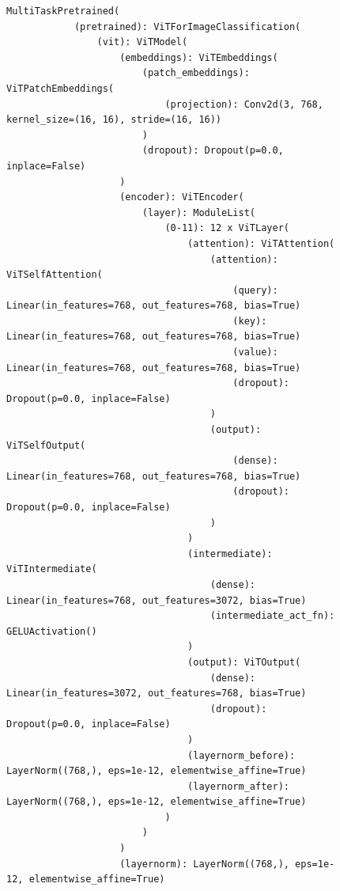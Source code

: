 \documentclass{article}
\begin{document}
\begin{figure}[H]
    \centering
    \begin{minipage}[b]{\textwidth}
        \begin{lstlisting}[caption={model architecture}, label={lst:appendix_code}, basicstyle=\small\small\ttfamily]
        MultiTaskPretrained(
            (pretrained): ViTForImageClassification(
                (vit): ViTModel(
                    (embeddings): ViTEmbeddings(
                        (patch_embeddings): ViTPatchEmbeddings(
                            (projection): Conv2d(3, 768, kernel_size=(16, 16), stride=(16, 16))
                        )
                        (dropout): Dropout(p=0.0, inplace=False)
                    )
                    (encoder): ViTEncoder(
                        (layer): ModuleList(
                            (0-11): 12 x ViTLayer(
                                (attention): ViTAttention(
                                    (attention): ViTSelfAttention(
                                        (query): Linear(in_features=768, out_features=768, bias=True)
                                        (key): Linear(in_features=768, out_features=768, bias=True)
                                        (value): Linear(in_features=768, out_features=768, bias=True)
                                        (dropout): Dropout(p=0.0, inplace=False)
                                    )
                                    (output): ViTSelfOutput(
                                        (dense): Linear(in_features=768, out_features=768, bias=True)
                                        (dropout): Dropout(p=0.0, inplace=False)
                                    )
                                )
                                (intermediate): ViTIntermediate(
                                    (dense): Linear(in_features=768, out_features=3072, bias=True)
                                    (intermediate_act_fn): GELUActivation()
                                )
                                (output): ViTOutput(
                                    (dense): Linear(in_features=3072, out_features=768, bias=True)
                                    (dropout): Dropout(p=0.0, inplace=False)
                                )
                                (layernorm_before): LayerNorm((768,), eps=1e-12, elementwise_affine=True)
                                (layernorm_after): LayerNorm((768,), eps=1e-12, elementwise_affine=True)
                            )
                        )
                    )
                    (layernorm): LayerNorm((768,), eps=1e-12, elementwise_affine=True)

\end{lstlisting}
\end{minipage}
\end{figure}
\end{document}
